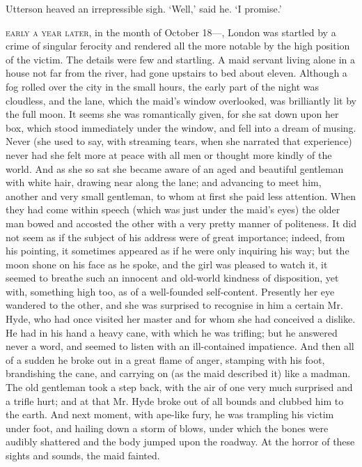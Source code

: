 \documentclass[]{novel}
\begin{document}
Utterson heaved an irrepressible sigh. ‘Well,’ said he. ‘I promise.’

\clearpage
\label{ch:04}
\begin{ChapterStart}
\vspace*{4\nbs}
\null\vspace{0.75\nbs}
\end{ChapterStart}

\textsc{early a year later,} in the month of October 18—, London was startled by a crime of singular ferocity and rendered all the more notable by the high position of the victim. The details were few and startling. A maid servant living alone in a house not far from the river, had gone upstairs to bed about eleven. Although a fog rolled over the city in the small hours, the early part of the night was cloudless, and the lane, which the maid’s window overlooked, was brilliantly lit by the full moon. It seems she was romantically given, for she sat down upon her box, which stood immediately under the window, and fell into a dream of musing. Never (she used to say, with streaming tears, when she narrated that experience) never had she felt more at peace with all men or thought more kindly of the world. And as she so sat she became aware of an aged and beautiful gentleman with white hair, drawing near along the lane; and advancing to meet him, another and very small gentleman, to whom at first she paid less attention. When they had come within speech (which was just under the maid’s eyes) the older man bowed and accosted the other with a very pretty manner of politeness. It did not seem as if the subject of his address were of great importance; indeed, from his pointing, it sometimes appeared as if he were only inquiring his way; but the moon shone on his face as he spoke, and the girl was pleased to watch it, it seemed to breathe such an innocent and old-world kindness of disposition, yet with, something high too, as of a well-founded self-content. Presently her eye wandered to the other, and she was surprised to recognise in him a certain Mr. Hyde, who had once visited her master and for whom she had conceived a dislike. He had in his hand a heavy cane, with which he was trifling; but he answered never a word, and seemed to listen with an ill-contained impatience. And then all of a sudden he broke out in a great flame of anger, stamping with his foot, brandishing the cane, and carrying on (as the maid described it) like a madman. The old gentleman took a step back, with the air of one very much surprised and a trifle hurt; and at that Mr. Hyde broke out of all bounds and clubbed him to the earth. And next moment, with ape-like fury, he was trampling his victim under foot, and hailing down a storm of blows, under which the bones were audibly shattered and the body jumped upon the roadway. At the horror of these sights and sounds, the maid fainted.
\end{document}
